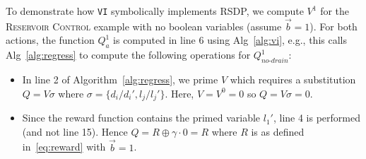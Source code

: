 \documentclass[letterpaper]{article}
\begin{document}
To demonstrate how \texttt{VI} symbolically implements RSDP, we compute $V^1$ for the \textsc{Reservoir Control} example with no boolean variables (assume $\vec{b}=1$). For both actions, the function $Q^1_a$ is computed in line 6 using Alg~\ref{alg:vi}, e.g., this calls Alg~\ref{alg:regress} to compute the following operations for $Q^1_{\mathit{no}\text{-}\mathit{drain}}$:
\begin{itemize}

\item In line 2 of Algorithm~\ref{alg:regress}, we prime $V$ which
  requires a substitution $Q= V \sigma$ where $\sigma = \lbrace
  d_i/d_i' , l_j/l_j' \rbrace$.  Here, $V=V^0=0$ so $Q=V\sigma=0$.

\item Since the reward function contains the primed variable $l_1'$,
  line 4 is performed (and not line 15).  Hence $Q=R\oplus \gamma\cdot 0 = R$
  where $R$ is as defined in~\eqref{eq:reward} with $\vec{b}=1$.


\end{itemize}
\end{document}
